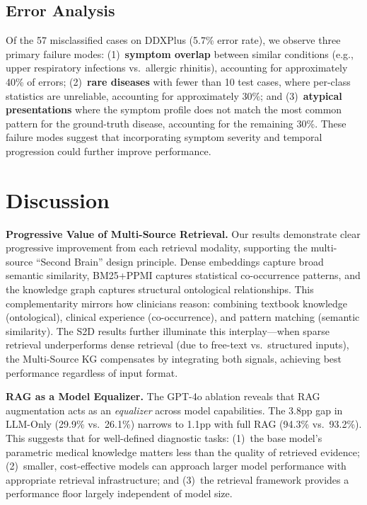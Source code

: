 \documentclass[runningheads]{llncs}
\begin{document}
\subsection{Error Analysis}
\label{sec:error_analysis}

Of the 57 misclassified cases on DDXPlus (5.7\% error rate), we observe three primary failure modes: (1)~\textbf{symptom overlap} between similar conditions (e.g., upper respiratory infections vs.\ allergic rhinitis), accounting for approximately 40\% of errors; (2)~\textbf{rare diseases} with fewer than 10 test cases, where per-class statistics are unreliable, accounting for approximately 30\%; and (3)~\textbf{atypical presentations} where the symptom profile does not match the most common pattern for the ground-truth disease, accounting for the remaining 30\%. These failure modes suggest that incorporating symptom severity and temporal progression could further improve performance.

\section{Discussion}
\label{sec:discussion}

\textbf{Progressive Value of Multi-Source Retrieval.}
Our results demonstrate clear progressive improvement from each retrieval modality, supporting the multi-source ``Second Brain'' design principle. Dense embeddings capture broad semantic similarity, BM25+PPMI captures statistical co-occurrence patterns, and the knowledge graph captures structural ontological relationships. This complementarity mirrors how clinicians reason: combining textbook knowledge (ontological), clinical experience (co-occurrence), and pattern matching (semantic similarity). The S2D results further illuminate this interplay---when sparse retrieval underperforms dense retrieval (due to free-text vs.\ structured inputs), the Multi-Source KG compensates by integrating both signals, achieving best performance regardless of input format.

\textbf{RAG as a Model Equalizer.}
The GPT-4o ablation reveals that RAG augmentation acts as an \emph{equalizer} across model capabilities. The 3.8pp gap in LLM-Only (29.9\% vs.\ 26.1\%) narrows to 1.1pp with full RAG (94.3\% vs.\ 93.2\%). This suggests that for well-defined diagnostic tasks: (1)~the base model's parametric medical knowledge matters less than the quality of retrieved evidence; (2)~smaller, cost-effective models can approach larger model performance with appropriate retrieval infrastructure; and (3)~the retrieval framework provides a performance floor largely independent of model size.
\end{document}
